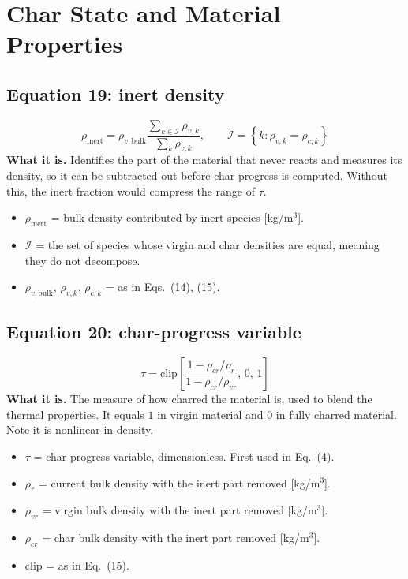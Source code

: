 \documentclass[11pt]{article}
\begin{document}
\section{Char State and Material Properties}

\subsection*{Equation 19: inert density}
\begin{equation}
\rho_{\mathrm{inert}} = \rho_{v,\mathrm{bulk}}
\frac{\sum_{k \in \mathcal{I}} \rho_{v,k}}{\sum_{k} \rho_{v,k}},
\qquad
\mathcal{I} = \left\{k : \rho_{v,k} = \rho_{c,k}\right\}
\end{equation}
\textbf{What it is.} Identifies the part of the material that never reacts and
measures its density, so it can be subtracted out before char progress is
computed. Without this, the inert fraction would compress the range of $\tau$.
\begin{itemize}
  \item $\rho_{\mathrm{inert}}$ = bulk density contributed by inert species
        [kg/m$^3$].
  \item $\mathcal{I}$ = the set of species whose virgin and char densities are
        equal, meaning they do not decompose.
  \item $\rho_{v,\mathrm{bulk}}$, $\rho_{v,k}$, $\rho_{c,k}$ = as in Eqs.~(14),
        (15).
\end{itemize}

\subsection*{Equation 20: char-progress variable}
\begin{equation}
\tau = \mathrm{clip}\!\left[
\frac{1 - \rho_{cr}/\rho_r}{1 - \rho_{cr}/\rho_{vr}},\, 0,\, 1\right]
\end{equation}
\textbf{What it is.} The measure of how charred the material is, used to blend
the thermal properties. It equals $1$ in virgin material and $0$ in fully charred
material. Note it is nonlinear in density.
\begin{itemize}
  \item $\tau$ = char-progress variable, dimensionless. First used in Eq.~(4).
  \item $\rho_r$ = current bulk density with the inert part removed [kg/m$^3$].
  \item $\rho_{vr}$ = virgin bulk density with the inert part removed [kg/m$^3$].
  \item $\rho_{cr}$ = char bulk density with the inert part removed [kg/m$^3$].
  \item $\mathrm{clip}$ = as in Eq.~(15).
\end{itemize}
\end{document}
